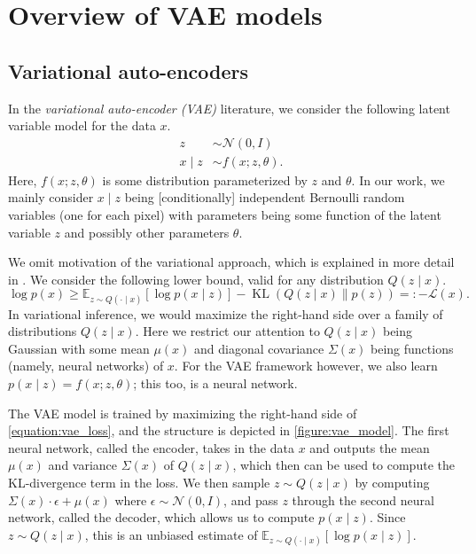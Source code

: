 \documentclass[10pt]{article}
\newcommand{\op}[1]{\operatorname{#1}}
\newcommand{\E}{\mathbb{E}}
\begin{document}



\section{Overview of VAE models}

\subsection{Variational auto-encoders}

In the \emph{variational auto-encoder (VAE)}  literature, we consider the following latent variable model for the data $x$.
\begin{align}
z &\sim \mathcal{N}(0,I)\\
x \mid z &\sim f(x ; z, \theta).
\end{align}
Here, $f(x;z,\theta)$ is some distribution parameterized by $z$ and $\theta$. In our work, we mainly consider $x \mid z$ being [conditionally] independent Bernoulli random variables (one for each pixel) with parameters being some function of the latent variable $z$ and possibly other parameters $\theta$.

We omit motivation of the variational approach, which is explained in more detail in \cite{doersch2016tutorial}.
We consider the following lower bound, valid for any distribution $Q(z \mid x)$.
\begin{equation}
\log p(x)
\ge \E_{z \sim Q(\cdot \mid x)}[\log p(x \mid z)]
- \op{KL}(Q(z \mid x) \| p(z)) =: -\mathcal{L}(x).
\label{equation:vae_loss}
\end{equation}
In variational inference, we would maximize the right-hand side over a family of distributions $Q(z \mid x)$. Here we restrict our attention to $Q(z \mid x)$ being Gaussian with some mean $\mu(x)$ and diagonal covariance $\Sigma(x)$ being functions (namely, neural networks) of $x$.
For the VAE framework however, we also learn $p(x \mid z) = f(x;z,\theta)$; this too, is a neural network.

The VAE model is trained by maximizing the right-hand side of \eqref{equation:vae_loss}, and the structure is depicted in \autoref{figure:vae_model}. The first neural network, called the encoder, takes in the data $x$ and outputs the mean $\mu(x)$ and variance $\Sigma(x)$ of $Q(z \mid x)$, which then can be used to compute the KL-divergence term in the loss. We then sample $z \sim Q(z \mid x)$ by computing $\Sigma(x)\cdot \epsilon + \mu(x)$ where $\epsilon \sim \mathcal{N}(0,I)$, and pass $z$ through the second neural network, called the decoder, which allows us to compute $p(x \mid z)$. Since $z \sim Q(z \mid x)$, this is an unbiased estimate of $\mathbb{E}_{z \sim Q(\cdot \mid x)} [\log p(x \mid z)]$.
\end{document}
